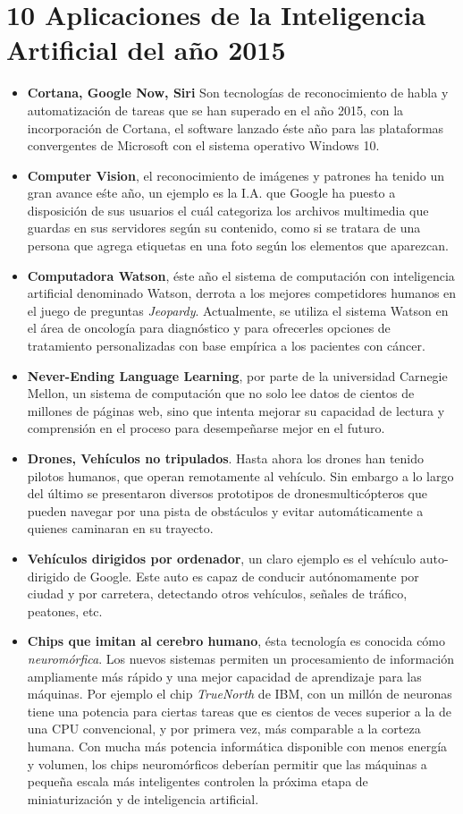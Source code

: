 \documentclass[a4paper,11pt, spanish]{report}
\begin{document}
\section*{10 Aplicaciones de la Inteligencia Artificial del año 2015}
\begin{itemize}
  \item \textbf{Cortana, Google Now, Siri} Son tecnologías de reconocimiento de habla y automatización de tareas que se han superado en el año 2015, con la incorporación de Cortana, el software lanzado éste año para las plataformas convergentes de Microsoft con el sistema operativo Windows 10.
  \item \textbf{Computer Vision}, el reconocimiento de imágenes y patrones ha tenido un gran avance eśte año, un ejemplo es la I.A. que Google ha puesto a disposición de sus usuarios el cuál categoriza los archivos multimedia que guardas en sus servidores según su contenido, como si se tratara de una persona que agrega etiquetas en una foto según los elementos que aparezcan. 
  \item \textbf{Computadora Watson}, éste año el sistema de computación con inteligencia artificial denominado Watson, derrota a los mejores competidores humanos en el juego de preguntas \textit{Jeopardy}. Actualmente, se utiliza el sistema Watson en el área de oncología para diagnóstico y para ofrecerles opciones de tratamiento personalizadas con base empírica a los pacientes con cáncer.
  \item \textbf{Never-Ending Language Learning}, por parte de la universidad Carnegie Mellon, un sistema de computación que no solo lee datos de cientos de millones de páginas web, sino que intenta mejorar su capacidad de lectura y comprensión en el proceso para desempeñarse mejor en el futuro.
  \item \textbf{Drones, Vehículos no tripulados}. Hasta ahora los drones han tenido pilotos humanos, que operan remotamente al vehículo. Sin embargo a lo largo del último se presentaron diversos prototipos de dronesmulticópteros que pueden navegar por una pista de obstáculos y evitar automáticamente a quienes caminaran en su trayecto.
  \item \textbf{Vehículos dirigidos por ordenador}, un claro ejemplo es el vehículo auto-dirigido de Google. Este auto es capaz de conducir autónomamente por ciudad y por carretera, detectando otros vehículos, señales de tráfico, peatones, etc.
  \item \textbf{Chips que imitan al cerebro humano}, ésta tecnología es conocida cómo \textit{neuromórfica}. Los nuevos sistemas permiten un procesamiento de información ampliamente más rápido y una mejor capacidad de aprendizaje para las máquinas. Por ejemplo el chip \textit{TrueNorth} de IBM, con un millón de neuronas tiene una potencia para ciertas tareas que es cientos de veces superior a la de una CPU convencional, y por primera vez, más comparable a la corteza humana. Con mucha más potencia informática disponible con menos energía y volumen, los chips neuromórficos deberían permitir que las máquinas a pequeña escala más inteligentes controlen la próxima etapa de miniaturización y de inteligencia artificial.

\end{itemize}
\end{document}
